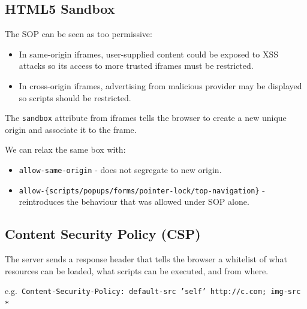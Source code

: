 \documentclass[11pt]{article}
\begin{document}
\subsection{HTML5 Sandbox}
The SOP can be seen as too permissive:
\begin{itemize}
  \item In same-origin iframes, user-supplied content could be exposed to XSS attacks so its access to more trusted iframes must be restricted.
  \item In cross-origin iframes, advertising from malicious provider may be displayed so scripts should be restricted.
\end{itemize}

The \texttt{sandbox} attribute from iframes tells the browser to create a new unique origin and associate it to the frame.

We can relax the same box with:
\begin{itemize}
  \item \texttt{allow-same-origin} - does not segregate to new origin.
  \item \texttt{allow-\{scripts/popups/forms/pointer-lock/top-navigation\}} - reintroduces the behaviour that was allowed under SOP alone.
\end{itemize}

\subsection{Content Security Policy (CSP)}
The server sends a response header that tells the browser a whitelist of what resources can be loaded, what scripts can be executed, and from where.

e.g.\ \texttt{Content-Security-Policy: default-src 'self' http://c.com; img-src *}
\end{document}
